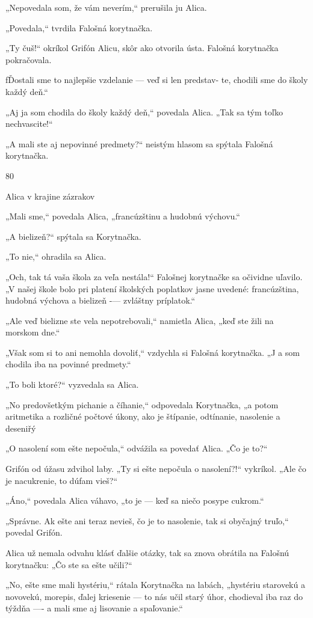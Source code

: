 \documentclass[12pt]{book}
\begin{document}
\begin{Parallel}[p]{}{}
{„Nepovedala som, že vám neverím,“ prerušila ju Alica.

„Povedala,“ tvrdila Falošná korytnačka.

„Ty čuš!“ okríkol Grifón Alicu, skôr ako otvorila ústa.
Falošná korytnačka pokračovala.

fĎostali sme to najlepšie vzdelanie — veď si len predstav-
te, chodili sme do školy každý deň.“

„Aj ja som chodila do školy každý deň,“ povedala Alica.
„Tak sa tým toľko nechvascite!“

„A mali ste aj nepovinné predmety?“ neistým hlasom sa  
spýtala Falošná korytnačka.

80

Alica v krajine zázrakov

„Mali sme,“ povedala Alica, „francúzštinu a hudobnú
výchovu.“

„A bielizeň?“ spýtala sa Korytnačka.

„To nie,“ ohradila sa Alica.

„Och, tak tá vaša škola za veľa nestála!“ Falošnej
korytnačke sa očividne uľavilo. „V našej škole bolo pri
platení školských poplatkov jasne uvedené: francúzština,
hudobná výchova a bielizeň -— zvláštny príplatok.“

„Ale veď bielizne ste vela nepotrebovali,“ namietla Alica,
„keď ste žili na morskom dne.“

„Však som si to ani nemohla dovoliť,“ vzdychla si Falošná
korytnačka. „J a som chodila iba na povinné predmety.“

„To boli ktoré?“ vyzvedala sa Alica.

„No predovšetkým pichanie a číhanie,“ odpovedala
Korytnačka, „a potom aritmetika a rozličné počtové úkony,
ako je štípanie, odtínanie, nasolenie a deseniřý

„O nasolení som ešte nepočula,“ odvážila sa povedať
Alica. „Čo je to?“

Grifón od úžasu zdvihol laby. „Ty si ešte nepočula
o nasolení?!“ vykríkol. „Ale čo je nacukrenie, to dúfam
vieš?“

„Áno,“ povedala Alica váhavo, „to je — keď sa niečo
posype cukrom.“

„Správne. Ak ešte ani teraz nevieš, čo je to nasolenie,
tak si obyčajný truľo,“ povedal Grifón.

Alica už nemala odvahu klásť ďalšie otázky, tak sa znova
obrátila na Falošnú korytnačku: „Čo ste sa ešte učili?“

„No, ešte sme mali hystériu,“ rátala Korytnačka na
labách, „hystériu starovekú a novovekú, morepis, ďalej
kriesenie — to nás učil starý úhor, chodieval iba raz do
týždňa —- a mali sme aj lisovanie a spaľovanie.“

}
\end{Parallel}
\end{document}
